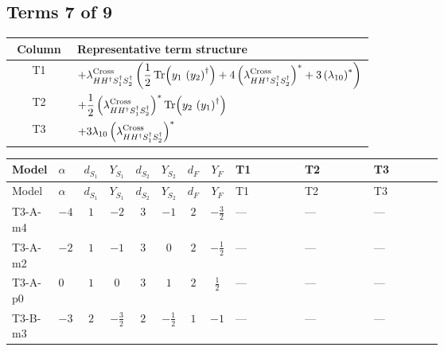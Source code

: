 \documentclass[8pt]{article}
\begin{document}
\begin{landscape}
\subsection*{Terms 7 of 9}
\begin{center}
\begin{tabular}{@{}c >{\raggedright\arraybackslash}p{0.82\linewidth}@{}}
\toprule
Column & Representative term structure \\
\midrule
T1 & \(\displaystyle +{\lambda_{H H^\dagger S_1^\dagger S_2^\dagger}^{\rm Cross}} \left(\frac{1}{2} \operatorname{Tr}\!\left({y_1}\,\left({y_2}\right)^{\dagger}\right)+4 \left({\lambda_{H H^\dagger S_1^\dagger S_2^\dagger}^{\rm Cross}}\right)^{*}+3 \left({\lambda_{10}}\right)^{*}\right)\) \\
\midrule
T2 & \(\displaystyle +\frac{1}{2} \left({\lambda_{H H^\dagger S_1^\dagger S_2^\dagger}^{\rm Cross}}\right)^{*} \operatorname{Tr}\!\left({y_2}\,\left({y_1}\right)^{\dagger}\right)\) \\
\midrule
T3 & \(\displaystyle +3 {\lambda_{10}} \left({\lambda_{H H^\dagger S_1^\dagger S_2^\dagger}^{\rm Cross}}\right)^{*}\) \\
\midrule
\bottomrule
\end{tabular}
\end{center}
\smallskip
\tiny
\begin{longtable}{@{}llcccccc >{\raggedright\arraybackslash}p{0.21\linewidth} >{\raggedright\arraybackslash}p{0.21\linewidth} >{\raggedright\arraybackslash}p{0.21\linewidth}@{}}
\toprule
Model & $\alpha$ & $d_{S_1}$ & $Y_{S_1}$ & $d_{S_2}$ & $Y_{S_2}$ & $d_F$ & $Y_F$ & T1 & T2 & T3 \\
\midrule
\endfirsthead
\toprule
Model & $\alpha$ & $d_{S_1}$ & $Y_{S_1}$ & $d_{S_2}$ & $Y_{S_2}$ & $d_F$ & $Y_F$ & T1 & T2 & T3 \\
\midrule
\endhead
T3-A-m4 & $-4$ & $1$ & $-2$ & $3$ & $-1$ & $2$ & $-\frac{3}{2}$ & --- & --- & --- \\
\midrule
T3-A-m2 & $-2$ & $1$ & $-1$ & $3$ & $0$ & $2$ & $-\frac{1}{2}$ & --- & --- & --- \\
\midrule
T3-A-p0 & $0$ & $1$ & $0$ & $3$ & $1$ & $2$ & $\frac{1}{2}$ & --- & --- & --- \\
\midrule
T3-B-m3 & $-3$ & $2$ & $-\frac{3}{2}$ & $2$ & $-\frac{1}{2}$ & $1$ & $-1$ & --- & --- & --- \\
\midrule

\end{longtable}
\end{landscape}
\end{document}
